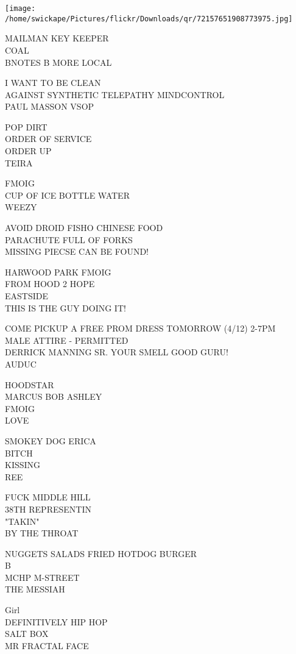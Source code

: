 \documentclass[10pt,letterpaper]{article}
\begin{document}
\texttt{[image: /home/swickape/Pictures/flickr/Downloads/qr/72157651908773975.jpg]}


MAILMAN KEY KEEPER\\
COAL\\
BNOTES B MORE LOCAL

I WANT TO BE CLEAN\\
AGAINST SYNTHETIC TELEPATHY MINDCONTROL\\
PAUL MASSON VSOP

POP DIRT\\
ORDER OF SERVICE\\
ORDER UP\\
TEIRA

FMOIG\\
CUP OF ICE BOTTLE WATER\\
WEEZY

AVOID DROID FISHO CHINESE FOOD\\
PARACHUTE FULL OF FORKS\\
MISSING PIECSE CAN BE FOUND!

HARWOOD PARK FMOIG\\
FROM HOOD 2 HOPE\\
EASTSIDE\\
THIS IS THE GUY DOING IT!

COME PICKUP A FREE PROM DRESS TOMORROW (4/12) 2{-}7PM\\
MALE ATTIRE {-} PERMITTED\\
DERRICK MANNING SR.  YOUR SMELL GOOD GURU!\\
AUDUC

HOODSTAR\\
MARCUS BOB ASHLEY\\
FMOIG\\
LOVE

SMOKEY DOG ERICA\\
BITCH\\
KISSING\\
REE

FUCK MIDDLE HILL\\
38TH REPRESENTIN\\
"TAKIN"\\
BY THE THROAT

NUGGETS SALADS FRIED HOTDOG BURGER\\
B\\
MCHP M{-}STREET\\
THE MESSIAH

Girl\\
DEFINITIVELY HIP HOP\\
SALT BOX\\
MR FRACTAL FACE
\end{document}
